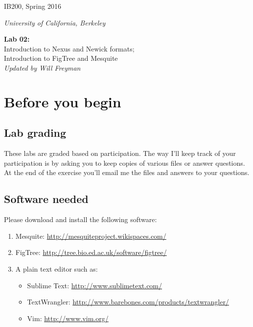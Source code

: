 \documentclass[11pt]{article}
\begin{document}
\noindent
\large
\begin{minipage}{0.5\textwidth}
\begin{flushleft} 
IB200, Spring 2016
\end{flushleft}
\end{minipage}
\begin{minipage}{0.5\textwidth}
\begin{flushright} 
\textit{University of California, Berkeley}
\end{flushright}
\end{minipage}

\vspace{0.5cm}


\begin{center}
\Large \textbf{Lab 02:} \\
Introduction to Nexus and Newick formats; \\ 
Introduction to FigTree and Mesquite \\
\normalsize
\textit{Updated by Will Freyman}
\end{center}

\vspace{0.5cm}

\section{Before you begin}

\subsection{Lab grading}

These labs are graded based on participation.
The way I'll keep track of your participation 
is by asking you to keep copies
of various files or answer questions. At the end
of the exercise you'll email me the files
and answers to your questions. 

\subsection{Software needed}

Please download and install the following software:
\begin{enumerate}
  \item Mesquite: \url{http://mesquiteproject.wikispaces.com/}
  \item FigTree: \url{http://tree.bio.ed.ac.uk/software/figtree/}
  \item A plain text editor such as: 
    \begin{itemize}
        \item Sublime Text: \url{http://www.sublimetext.com/}
        \item TextWrangler: \url{http://www.barebones.com/products/textwrangler/}
        \item Vim: \url{http://www.vim.org/}
    \end{itemize}
\end{enumerate}
\end{document}

